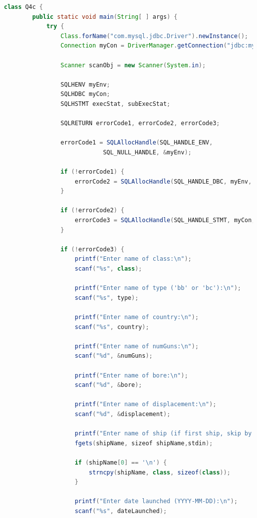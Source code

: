 \documentclass[12pt]{article}
\begin{document}
\begin{enumerate}[1.]
\begin{enumerate}[a)]
\begin{lstlisting}[language=JAVA]
    class Q4c {
        public static void main(String[ ] args) {
            try {
                Class.forName("com.mysql.jdbc.Driver").newInstance();
                Connection myCon = DriverManager.getConnection("jdbc:mysql://localhost/Q4");

                Scanner scanObj = new Scanner(System.in);

                SQLHENV myEnv;
                SQLHDBC myCon;
                SQLHSTMT execStat, subExecStat;

                SQLRETURN errorCode1, errorCode2, errorCode3;

                errorCode1 = SQLAllocHandle(SQL_HANDLE_ENV,
                            SQL_NULL_HANDLE, &myEnv);

                if (!errorCode1) {
                    errorCode2 = SQLAllocHandle(SQL_HANDLE_DBC, myEnv, &myCon);
                }

                if (!errorCode2) {
                    errorCode3 = SQLAllocHandle(SQL_HANDLE_STMT, myCon, &execStat)
                }

                if (!errorCode3) {
                    printf("Enter name of class:\n");
                    scanf("%s", class);

                    printf("Enter name of type ('bb' or 'bc'):\n");
                    scanf("%s", type);

                    printf("Enter name of country:\n");
                    scanf("%s", country);

                    printf("Enter name of numGuns:\n");
                    scanf("%d", &numGuns);

                    printf("Enter name of bore:\n");
                    scanf("%d", &bore);

                    printf("Enter name of displacement:\n");
                    scanf("%d", &displacement);

                    printf("Enter name of ship (if first ship, skip by pressing ENTER):\n");
                    fgets(shipName, sizeof shipName,stdin);

                    if (shipName[0] == '\n') {
                        strncpy(shipName, class, sizeof(class));
                    }

                    printf("Enter date launched (YYYY-MM-DD):\n");
                    scanf("%s", dateLaunched);


\end{lstlisting}
\end{enumerate}
\end{enumerate}
\end{document}
